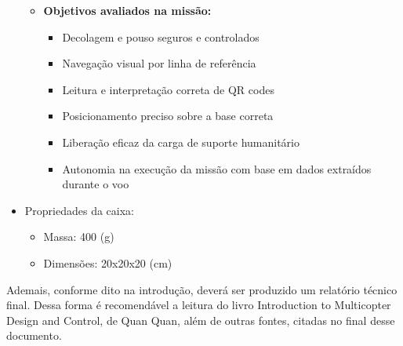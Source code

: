 \begin{itemize}
\begin{itemize}
        \item \textbf{Objetivos avaliados na missão:} 
        \begin{itemize}
            \item Decolagem e pouso seguros e controlados
            \item Navegação visual por linha de referência
            \item Leitura e interpretação correta de QR codes
            \item Posicionamento preciso sobre a base correta
            \item Liberação eficaz da carga de suporte humanitário
            \item Autonomia na execução da missão com base em dados extraídos durante o voo
        \end{itemize}
    \end{itemize}

    \item {\color{red} Propriedades da caixa:
    
    \begin{itemize}
        \item Massa: 400 (g)
        \item Dimensões: 20x20x20 (cm)
    \end{itemize}}
\end{itemize}

Ademais, conforme dito na introdução, deverá ser produzido um relatório técnico final. Dessa forma é recomendável a leitura do livro Introduction to Multicopter Design and Control, de Quan Quan, além de outras fontes, citadas no final desse documento.